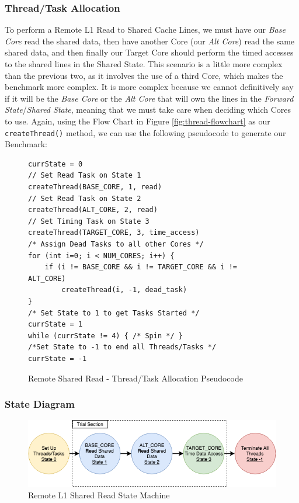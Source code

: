 \documentclass[bsc,frontabs,twoside,singlespacing,parskip,deptreport]{infthesis}     %
\begin{document}
\subsubsection{Thread/Task Allocation}
To perform a Remote L1 Read to Shared Cache Lines, we must have our \emph{Base Core} read the shared data, then have another Core (our \emph{Alt Core}) read the same shared data, and then finally our Target Core should perform the timed accesses to the shared lines in the Shared State. This scenario is a little more complex than the previous two, as it involves the use of a third Core, which makes the benchmark more complex. It is more complex because we cannot definitively say if it will be the \emph{Base Core} or the \emph{Alt Core} that will own the lines in the \textit{Forward State}/\textit{Shared State}, meaning that we must take care when deciding which Cores to use. Again, using the Flow Chart in Figure \ref{fig:thread-flowchart} as our \texttt{createThread()} method, we can use the following pseudocode to generate our Benchmark:

\begin{figure}[!h]
    \centering
    \begin{minipage}{0.7\textwidth}
    \begin{verbatim}
currState = 0
// Set Read Task on State 1
createThread(BASE_CORE, 1, read)
// Set Read Task on State 2
createThread(ALT_CORE, 2, read)
// Set Timing Task on State 3
createThread(TARGET_CORE, 3, time_access)
/* Assign Dead Tasks to all other Cores */
for (int i=0; i < NUM_CORES; i++) {
    if (i != BASE_CORE && i != TARGET_CORE && i != ALT_CORE)
        createThread(i, -1, dead_task)
}
/* Set State to 1 to get Tasks Started */
currState = 1
while (currState != 4) { /* Spin */ }
/*Set State to -1 to end all Threads/Tasks */
currState = -1
    \end{verbatim}
    \end{minipage}
    \caption{Remote Shared Read - Thread/Task Allocation Pseudocode}
    \label{fig:remote-S-read-pseudo}
\end{figure}


\subsubsection{State Diagram}
\begin{figure}[!h]
    \centering
    \includegraphics[width=125mm]{SharedState.png}
    \caption{Remote L1 Shared Read State Machine}
    \label{fig:remote-S-read-state}
\end{figure}
\end{document}
